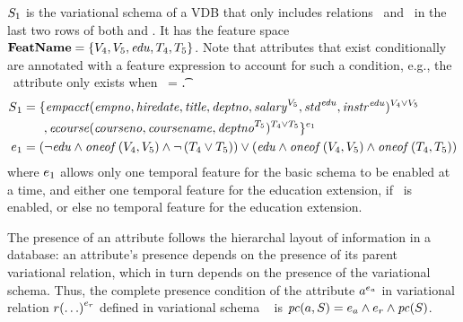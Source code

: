 \begin{example}
\label{eg:vsch}
$\vSch_1$ is the variational schema of a VDB that only includes relations \empacct\ and \ecourse\ in the last two rows
of both  and . It has the
feature space 
\ensuremath{\fSet = \setDef{ \vFour, \vFive, \edu, \tFour, \tFive}}.
Note that attributes that exist conditionally are annotated with a feature expression
to account for such a condition, e.g., the \salary\ attribute only exists when \vFive\ = \t.
%
\begin{align*}
\vSch_1 &=
\{ \empacct ( \empno, \hiredate, \titleatt, \deptno, \annot [\vFive] \salary, 
 \annot [\edu] \isstudent,
\annot [\edu] \isteacher )^{\vFour \vee \vFive}\\
%
&\hspace{17pt}, \ecourse ( \cno, \cname, \annot [\tFive] \deptno )^{\tFour \vee \tFive} \}^{\dimMeta_1}\\
\dimMeta_1 &= 
\paran {\neg \edu \wedge \oneof {\vFour, \vFive} \wedge \neg \paran {\tFour \vee \tFive}
 }
\vee
\paran {\edu \wedge \oneof {\vFour, \vFive}
\wedge
\oneof {\tFour, \tFive}}
\end{align*}
where \ensuremath{\dimMeta_1} allows only one temporal feature for the basic
schema to be enabled at a time, and either one temporal feature for the education
extension, if \edu\ is enabled, or else no temporal feature for the education
extension.
\end{example}



The presence of an attribute follows the hierarchal layout of information in a database:
an attribute's presence depends on the presence of its parent variational relation, which in turn 
depends on the presence of the variational schema. 
%
Thus, the complete presence condition of the attribute
$\annot[\dimMeta_\vAtt]{\vAtt}$ in variational relation
$\vRel\annot[\dimMeta_\vRel]{(\ldots)}$ defined in variational schema \vSch\
is
$\getPCfrom{\vAtt}{\vSch}=\dimMeta_\vAtt\wedge\dimMeta_\vRel\wedge \getPC \vSch$.


